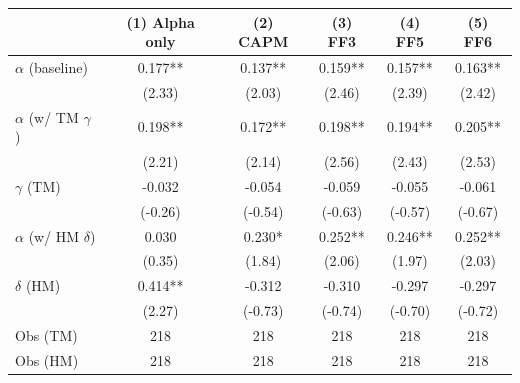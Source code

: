 \begin{tabular}{lccccc}
\toprule
 & (1) Alpha only & (2) CAPM & (3) FF3 & (4) FF5 & (5) FF6 \\
\midrule
$\alpha$ (baseline) & 0.177** & 0.137** & 0.159** & 0.157** & 0.163** \\
 & (2.33) & (2.03) & (2.46) & (2.39) & (2.42) \\
$\alpha$ (w/ TM $\gamma$) & 0.198** & 0.172** & 0.198** & 0.194** & 0.205** \\
 & (2.21) & (2.14) & (2.56) & (2.43) & (2.53) \\
$\gamma$ (TM) & -0.032 & -0.054 & -0.059 & -0.055 & -0.061 \\
 & (-0.26) & (-0.54) & (-0.63) & (-0.57) & (-0.67) \\
$\alpha$ (w/ HM $\delta$) & 0.030 & 0.230* & 0.252** & 0.246** & 0.252** \\
 & (0.35) & (1.84) & (2.06) & (1.97) & (2.03) \\
$\delta$ (HM) & 0.414** & -0.312 & -0.310 & -0.297 & -0.297 \\
 & (2.27) & (-0.73) & (-0.74) & (-0.70) & (-0.72) \\
Obs (TM) & 218 & 218 & 218 & 218 & 218 \\
Obs (HM) & 218 & 218 & 218 & 218 & 218 \\
\bottomrule
\end{tabular}
